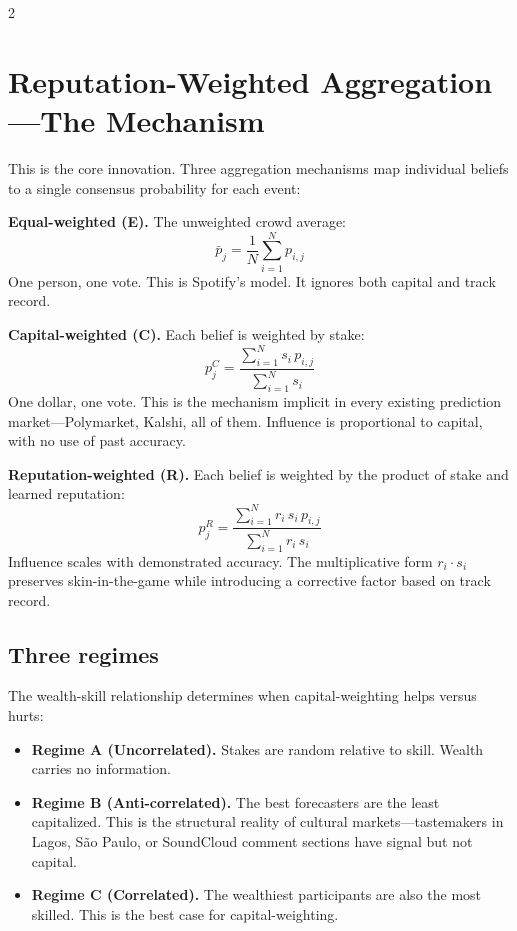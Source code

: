 \documentclass[9pt,oneside]{amsart}
\begin{document}
\begin{multicols}{2}
\section{Reputation-Weighted Aggregation---The Mechanism}

This is the core innovation. Three aggregation mechanisms map individual beliefs to a single consensus probability for each event:

\textbf{Equal-weighted (E).} The unweighted crowd average:
\begin{equation}
  \bar{p}_j = \frac{1}{N} \sum_{i=1}^{N} p_{i,j}
\end{equation}
One person, one vote. This is Spotify's model. It ignores both capital and track record.

\textbf{Capital-weighted (C).} Each belief is weighted by stake:
\begin{equation}
  p_j^C = \frac{\sum_{i=1}^{N} s_i \, p_{i,j}}{\sum_{i=1}^{N} s_i}
\end{equation}
One dollar, one vote. This is the mechanism implicit in every existing prediction market---Polymarket, Kalshi, all of them. Influence is proportional to capital, with no use of past accuracy.

\textbf{Reputation-weighted (R).} Each belief is weighted by the product of stake and learned reputation:
\begin{equation}
  p_j^R = \frac{\sum_{i=1}^{N} r_i \, s_i \, p_{i,j}}{\sum_{i=1}^{N} r_i \, s_i}
\end{equation}
Influence scales with demonstrated accuracy. The multiplicative form $r_i \cdot s_i$ preserves skin-in-the-game while introducing a corrective factor based on track record.

\subsection{Three regimes}

The wealth-skill relationship determines when capital-weighting helps versus hurts:

\begin{itemize}[nosep]
  \item \textbf{Regime A (Uncorrelated).} Stakes are random relative to skill. Wealth carries no information.
  \item \textbf{Regime B (Anti-correlated).} The best forecasters are the least capitalized. This is the structural reality of cultural markets---tastemakers in Lagos, S\~ao Paulo, or SoundCloud comment sections have signal but not capital.
  \item \textbf{Regime C (Correlated).} The wealthiest participants are also the most skilled. This is the best case for capital-weighting.
\end{itemize}


\end{multicols}
\end{document}
